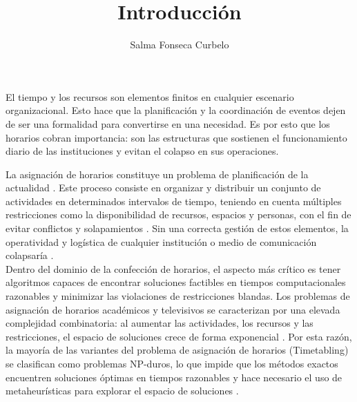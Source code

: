\documentclass[12pt]{article}
\title{Introducción}
\author{Salma Fonseca Curbelo}
\date{}
\begin{document}
  
\maketitle
El tiempo y los recursos son elementos finitos en cualquier escenario organizacional. Esto hace que la planificación y la coordinación de eventos dejen de ser una formalidad para convertirse en una necesidad. Es por esto que los horarios cobran importancia: son las estructuras que sostienen el funcionamiento diario de las instituciones y evitan el colapso en sus operaciones.

La asignación de horarios constituye un problema de planificación de la actualidad \cite{wren1996}. Este proceso consiste en organizar y distribuir un conjunto de actividades en determinados intervalos de tiempo, teniendo en cuenta múltiples restricciones como la disponibilidad de recursos, espacios y personas, con el fin de evitar conflictos y solapamientos \cite{schaerf1999}. Sin una correcta gestión de estos elementos, la operatividad y logística de cualquier institución o medio de comunicación colapsaría \cite{burke2002}.\\

Dentro del dominio de la confección de horarios, el aspecto más crítico es tener algoritmos capaces de encontrar soluciones factibles en tiempos computacionales razonables y minimizar las violaciones de restricciones blandas. Los problemas de asignación de horarios académicos y televisivos se caracterizan por una elevada complejidad combinatoria: al aumentar las actividades, los recursos y las restricciones, el espacio de soluciones crece de forma exponencial \cite{karp1972}. Por esta razón, la mayoría de las variantes del problema de asignación de horarios (Timetabling) se clasifican como problemas NP-duros, lo que impide que los métodos exactos encuentren soluciones óptimas en tiempos razonables y hace necesario el uso de metaheurísticas para explorar el espacio de soluciones \cite{burke2002}. 
\end{document}
